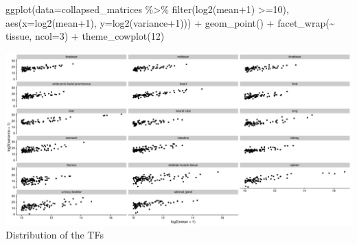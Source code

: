 \documentclass[
]{article}
\newenvironment{Shaded}{\begin{snugshade}}{\end{snugshade}}
\newcommand{\AttributeTok}[1]{\textcolor[rgb]{0.77,0.63,0.00}{#1}}
\newcommand{\DecValTok}[1]{\textcolor[rgb]{0.00,0.00,0.81}{#1}}
\newcommand{\FunctionTok}[1]{\textcolor[rgb]{0.00,0.00,0.00}{#1}}
\newcommand{\NormalTok}[1]{#1}
\newcommand{\SpecialCharTok}[1]{\textcolor[rgb]{0.00,0.00,0.00}{#1}}
\begin{document}
\begin{Shaded}
\begin{Highlighting}[]
\FunctionTok{ggplot}\NormalTok{(}\AttributeTok{data=}\NormalTok{collapsed\_matrices  }\SpecialCharTok{\%\textgreater{}\%} \FunctionTok{filter}\NormalTok{(}\FunctionTok{log2}\NormalTok{(mean}\SpecialCharTok{+}\DecValTok{1}\NormalTok{) }\SpecialCharTok{\textgreater{}=}\DecValTok{10}\NormalTok{), }\FunctionTok{aes}\NormalTok{(}\AttributeTok{x=}\FunctionTok{log2}\NormalTok{(mean}\SpecialCharTok{+}\DecValTok{1}\NormalTok{), }\AttributeTok{y=}\FunctionTok{log2}\NormalTok{(variance}\SpecialCharTok{+}\DecValTok{1}\NormalTok{))) }\SpecialCharTok{+} \FunctionTok{geom\_point}\NormalTok{() }\SpecialCharTok{+}  \FunctionTok{facet\_wrap}\NormalTok{(}\SpecialCharTok{\textasciitilde{}}\NormalTok{ tissue, }\AttributeTok{ncol=}\DecValTok{3}\NormalTok{) }\SpecialCharTok{+} \FunctionTok{theme\_cowplot}\NormalTok{(}\DecValTok{12}\NormalTok{) }
\end{Highlighting}
\end{Shaded}

\includegraphics{Exploration_files/figure-latex/unnamed-chunk-18-1.pdf}
Distribution of the TFs
\end{document}
